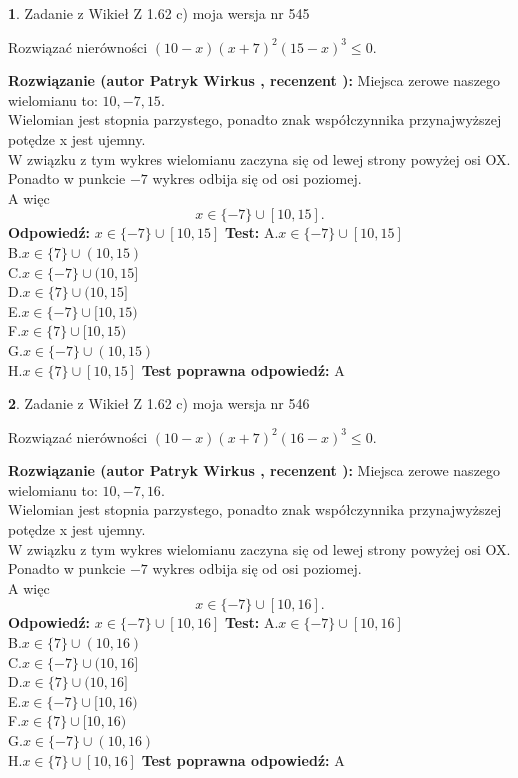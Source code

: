 \documentclass[12pt, a4paper]{article}
\theoremstyle{definition} %
\newtheorem{zad}{}
\newcommand{\zadStart}[1]{\begin{zad}#1\newline}
\newcommand{\zadStop}{\end{zad}}
\newcommand{\rozwStart}[2]{\noindent \textbf{Rozwiązanie (autor #1 , recenzent #2): }\newline}
\newcommand{\rozwStop}{\newline}
\newcommand{\odpStart}{\noindent \textbf{Odpowiedź:}\newline}
\newcommand{\odpStop}{\newline}
\newcommand{\testStart}{\noindent \textbf{Test:}\newline}
\newcommand{\testStop}{\newline}
\newcommand{\kluczStart}{\noindent \textbf{Test poprawna odpowiedź:}\newline}
\newcommand{\kluczStop}{\newline}
\begin{document}
\zadStart{Zadanie z Wikieł Z 1.62 c) moja wersja nr 545}

Rozwiązać nierówności $(10-x)(x+7)^{2}(15-x)^{3}\le0$.
\zadStop
\rozwStart{Patryk Wirkus}{}
Miejsca zerowe naszego wielomianu to: $10, -7, 15$.\\
Wielomian jest stopnia parzystego, ponadto znak współczynnika przy\linebreak najwyższej potędze x jest ujemny.\\ W związku z tym wykres wielomianu zaczyna się od lewej strony powyżej osi OX.\\
Ponadto w punkcie $-7$ wykres odbija się od osi poziomej.\\
A więc $$x \in \{-7\} \cup [10,15].$$
\rozwStop
\odpStart
$x \in \{-7\} \cup [10,15]$
\odpStop
\testStart
A.$x \in \{-7\} \cup [10,15]$\\
B.$x \in \{7\} \cup (10,15)$\\
C.$x \in \{-7\} \cup (10,15]$\\
D.$x \in \{7\} \cup (10,15]$\\
E.$x \in \{-7\} \cup [10,15)$\\
F.$x \in \{7\} \cup [10,15)$\\
G.$x \in \{-7\} \cup (10,15)$\\
H.$x \in \{7\} \cup [10,15]$
\testStop
\kluczStart
A
\kluczStop



\zadStart{Zadanie z Wikieł Z 1.62 c) moja wersja nr 546}

Rozwiązać nierówności $(10-x)(x+7)^{2}(16-x)^{3}\le0$.
\zadStop
\rozwStart{Patryk Wirkus}{}
Miejsca zerowe naszego wielomianu to: $10, -7, 16$.\\
Wielomian jest stopnia parzystego, ponadto znak współczynnika przy\linebreak najwyższej potędze x jest ujemny.\\ W związku z tym wykres wielomianu zaczyna się od lewej strony powyżej osi OX.\\
Ponadto w punkcie $-7$ wykres odbija się od osi poziomej.\\
A więc $$x \in \{-7\} \cup [10,16].$$
\rozwStop
\odpStart
$x \in \{-7\} \cup [10,16]$
\odpStop
\testStart
A.$x \in \{-7\} \cup [10,16]$\\
B.$x \in \{7\} \cup (10,16)$\\
C.$x \in \{-7\} \cup (10,16]$\\
D.$x \in \{7\} \cup (10,16]$\\
E.$x \in \{-7\} \cup [10,16)$\\
F.$x \in \{7\} \cup [10,16)$\\
G.$x \in \{-7\} \cup (10,16)$\\
H.$x \in \{7\} \cup [10,16]$
\testStop
\kluczStart
A
\kluczStop
\end{document}
